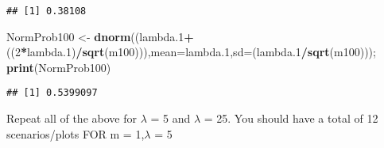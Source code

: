 \documentclass[
]{article}
\newenvironment{Shaded}{\begin{snugshade}}{\end{snugshade}}
\newcommand{\DataTypeTok}[1]{\textcolor[rgb]{0.13,0.29,0.53}{#1}}
\newcommand{\DecValTok}[1]{\textcolor[rgb]{0.00,0.00,0.81}{#1}}
\newcommand{\FloatTok}[1]{\textcolor[rgb]{0.00,0.00,0.81}{#1}}
\newcommand{\KeywordTok}[1]{\textcolor[rgb]{0.13,0.29,0.53}{\textbf{#1}}}
\newcommand{\NormalTok}[1]{#1}
\newcommand{\OperatorTok}[1]{\textcolor[rgb]{0.81,0.36,0.00}{\textbf{#1}}}
\newcommand{\StringTok}[1]{\textcolor[rgb]{0.31,0.60,0.02}{#1}}
\begin{document}
\begin{verbatim}
## [1] 0.38108
\end{verbatim}

\begin{Shaded}
\begin{Highlighting}[]
\NormalTok{NormProb100 <-}\StringTok{ }\KeywordTok{dnorm}\NormalTok{((lambda}\FloatTok{.1}\OperatorTok{+}\NormalTok{((}\DecValTok{2}\OperatorTok{*}\NormalTok{lambda}\FloatTok{.1}\NormalTok{)}\OperatorTok{/}\KeywordTok{sqrt}\NormalTok{(m100))),}\DataTypeTok{mean=}\NormalTok{lambda}\FloatTok{.1}\NormalTok{,}\DataTypeTok{sd=}\NormalTok{(lambda}\FloatTok{.1}\OperatorTok{/}\KeywordTok{sqrt}\NormalTok{(m100))); }\KeywordTok{print}\NormalTok{(NormProb100)}
\end{Highlighting}
\end{Shaded}

\begin{verbatim}
## [1] 0.5399097
\end{verbatim}

Repeat all of the above for \(\lambda\) = 5 and \(\lambda\) = 25. You
should have a total of 12 scenarios/plots FOR m = 1,\(\lambda\) = 5
\end{document}
